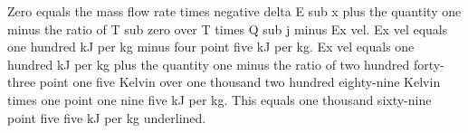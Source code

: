Zero equals the mass flow rate times negative delta E sub x plus the quantity one minus the ratio of T sub zero over T times Q sub j minus Ex vel. Ex vel equals one hundred kJ per kg minus four point five kJ per kg. Ex vel equals one hundred kJ per kg plus the quantity one minus the ratio of two hundred forty-three point one five Kelvin over one thousand two hundred eighty-nine Kelvin times one point one nine five kJ per kg. This equals one thousand sixty-nine point five five kJ per kg underlined.